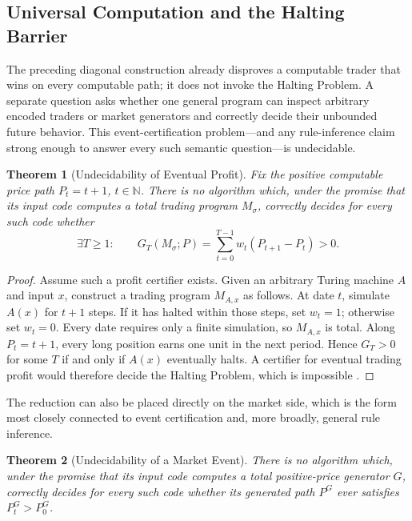 \documentclass[aps,pra,reprint,superscriptaddress,amsmath,amssymb,floatfix]{revtex4-2}
\theoremstyle{plain}
\newtheorem{theorem}{Theorem}
\theoremstyle{definition}
\theoremstyle{remark}
\begin{document}
\subsection{Universal Computation and the Halting Barrier}

The preceding diagonal construction already disproves a computable trader that
wins on every computable path; it does not invoke the Halting Problem. A
separate question asks whether one general program can inspect arbitrary
encoded traders or market generators and correctly decide their unbounded
future behavior. This event-certification problem---and any rule-inference
claim strong enough to answer every such semantic question---is undecidable.

\begin{theorem}[Undecidability of Eventual Profit]
  \label{thm:profit-undecidable}
  Fix the positive computable price path \(P_t=t+1\), \(t\in\mathbb{N}\).
  There is no algorithm which, under the promise that its input code computes
  a total trading program \(M_\sigma\), correctly decides for every such code
  whether
  \[
    \exists T\geq1:\qquad
    G_T(M_\sigma;P)=
    \sum_{t=0}^{T-1}w_t(P_{t+1}-P_t)>0.
  \]
\end{theorem}

\begin{proof}
Assume such a profit certifier exists. Given an arbitrary Turing machine
\(A\) and input \(x\), construct a trading program \(M_{A,x}\) as follows.
At date \(t\), simulate \(A(x)\) for \(t+1\) steps. If it has halted within
those steps, set \(w_t=1\); otherwise set \(w_t=0\). Every date requires only
a finite simulation, so \(M_{A,x}\) is total. Along \(P_t=t+1\), every long
position earns one unit in the next period. Hence \(G_T>0\) for some \(T\) if
and only if \(A(x)\) eventually halts. A certifier for eventual trading profit
would therefore decide the Halting Problem, which is impossible
\cite{turing-36}.
\end{proof}

The reduction can also be placed directly on the market side, which is the
form most closely connected to event certification and, more broadly, general
rule inference.

\begin{theorem}[Undecidability of a Market Event]
  \label{thm:market-undecidable}
  There is no algorithm which, under the promise that its input code computes
  a total positive-price generator \(G\), correctly decides for every such
  code whether its generated path \(P^G\) ever satisfies \(P_t^G>P_0^G\).
\end{theorem}
\end{document}
